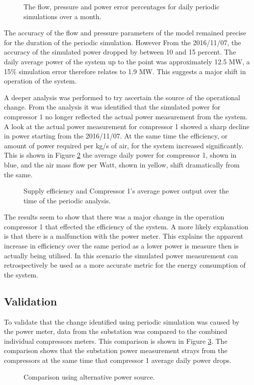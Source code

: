 	\begin{figure}[h]
		\centering
		\fbox{}
		\caption{The flow, pressure and power error percentages for daily periodic simulations over a month.}
		\label{fig: Periodic simulation}
	\end{figure}   
The accuracy of the flow and pressure parameters of the model remained precise for the duration of the periodic simulation. However From the 2016/11/07, the accuracy of the simulated power dropped by between 10 and 15 percent. The daily average power of the system up to the point was approximately 12.5 MW, a 15\% simulation error therefore relates to 1.9 MW. This suggests a major shift in operation of the system.
\par 
A deeper analysis was performed to try ascertain the source of the operational change. From the analysis it was identified that the simulated power for compressor 1 no longer reflected the actual power measurement from the system. A look at the actual power measurement for compressor 1 showed a sharp decline in power starting from the 2016/11/07. At the same time the efficiency, or amount of power required per kg/s of air, for the system increased significantly. This is shown in Figure \ref{fig: MeasurementAccuracy.} the average daily power for compressor 1, shown in blue, and the air mass flow per Watt, shown in yellow, shift dramatically from the same. 
	\begin{figure}[h]
		\centering
		\fbox{}
		\caption{Supply efficiency and Compressor 1's average power output over the time of the periodic analysis.}
		\label{fig: MeasurementAccuracy.}
	\end{figure} 
   The results seem to show that there was a major change in the operation compressor 1 that effected the efficiency of the system. A more likely explanation is that there is a malfunction with the power meter. This explains the apparent increase in efficiency over the same period as a lower power is measure then is actually being utilised. In this scenario the simulated power measurement can retrospectively be used as a more accurate metric for the energy consumption of the system.  
   \subsection{Validation}
   To validate that the change identified using periodic simulation was caused by the power meter, data from the substation was compared to the combined individual compressors meters. This comparison is shown in Figure \ref{fig: Corrected Periodic simulation}. The comparison shows that the substation power measurement strays from the compressors at the same time that compressor 1 average daily power drops.
	\begin{figure}[h]
		\centering
		\fbox{}
		\caption{Comparison using alternative power source.}
		\label{fig: Corrected Periodic simulation}
	\end{figure}    
	
